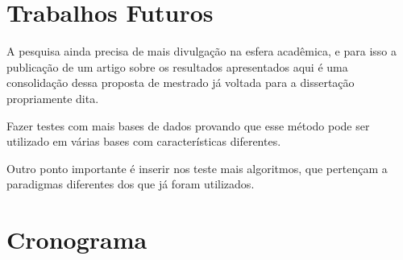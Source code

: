 \section{Trabalhos Futuros}\label{cap:fut}

A pesquisa ainda precisa de mais divulgação na esfera acadêmica, e para isso a publicação de um artigo sobre os resultados apresentados aqui é uma consolidação dessa proposta de mestrado já voltada para a dissertação propriamente dita.

Fazer testes com mais bases de dados  provando que esse método pode ser utilizado em várias bases com características  diferentes.

Outro ponto importante é inserir nos teste mais algoritmos, que pertençam a  paradigmas diferentes dos que já foram utilizados.




\section{Cronograma}\label{cap:cron}

